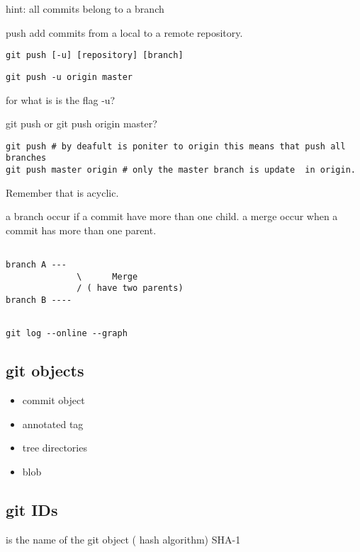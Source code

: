 \documentclass[10pt,a4paper]{article}
\begin{document}
hint: all commits belong to a branch



push add commits from a local to a remote repository.


\begin{verbatim}
git push [-u] [repository] [branch]
\end{verbatim}

\begin{verbatim}
git push -u origin master
\end{verbatim}
for what is is the flag -u?


git push or git push origin master?

\begin{verbatim}
git push # by deafult is poniter to origin this means that push all branches
git push master origin # only the master branch is update  in origin.
\end{verbatim}

Remember that is acyclic. 

a branch occur if a commit have more than one child.
a merge occur when a commit has more than one parent.

\begin{verbatim}

branch A ---
              \      Merge
              / ( have two parents) 
branch B ---- 


\end{verbatim}




\begin{verbatim}
git log --online --graph 
\end{verbatim}


\subsection{git objects}
\begin{itemize}
\item commit object
\item annotated tag
\item tree directories
\item blob
\end{itemize}

\subsection{git IDs}
is the name of the git object ( hash algorithm) SHA-1
\end{document}
